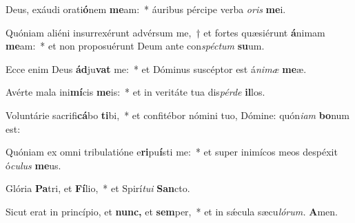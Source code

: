 \item Deus, exáudi orati\textbf{ó}nem \textbf{me}am:~* áuribus pércipe verba \textit{oris} \textbf{me}i.
\item Quóniam aliéni insurrexérunt advérsum me,~† et fortes quæsiérunt \textbf{á}nimam \textbf{me}am:~* et non proposuérunt Deum ante con\tinyhspace\textit{spéctum} \textbf{su}um.
\item Ecce enim Deus \textbf{ád}ju\textbf{vat} me:~* et Dóminus suscéptor est á\textit{nimæ} \textbf{me}æ.
\item Avérte mala ini\textbf{mí}cis \textbf{me}is:~* et in veritáte tua dis\textit{pérde} \textbf{il}los.
\item Voluntárie sacrifi\textbf{cá}bo \textbf{ti}bi,~* et confitébor nómini tuo, Dómine: quón\textit{iam} \textbf{bo}num est:
\item Quóniam ex omni tribulatióne e\textbf{ri}pu\textbf{í}sti me:~* et super inimícos meos despéxit ó\textit{culus} \textbf{me}us.
\item Glória \textbf{Pa}tri, et \textbf{Fí}lio,~* et Spirí\tinyhspace\textit{tui} \textbf{San}cto.
\item Sicut erat in princípio, et \textbf{nunc,} et \textbf{sem}per,~* et in sǽcula sæcu\tinyhspace\textit{lórum.} \textbf{A}men.